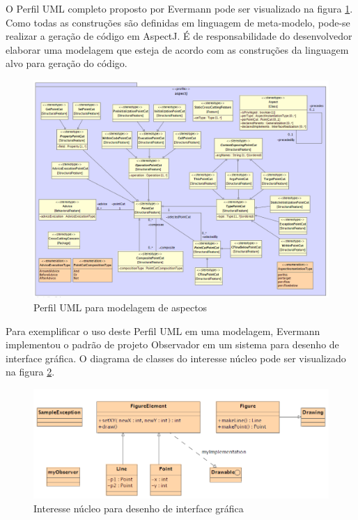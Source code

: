 O Perfil UML completo proposto por Evermann pode ser visualizado na figura \ref{fig:p21_aspectj_profile}. Como todas as construções são definidas em
linguagem de meta-modelo, pode-se realizar a geração de código em AspectJ. É de responsabilidade do desenvolvedor elaborar uma modelagem que esteja de acordo 
com as construções da linguagem alvo para geração do código. 

\begin{landscape}
\begin{figure}
	\centering
	\includegraphics[scale=0.6]{img/p21_aspectj_profile.png}
	\caption{Perfil UML para modelagem de aspectos \cite{Evermann:2007:MSP:1229375.1229379}}\label{fig:p21_aspectj_profile}
\end{figure}
\end{landscape}

Para exemplificar o uso deste Perfil UML em uma modelagem, Evermann implementou o padrão de projeto Observador \cite{Gamma:1995:DPE:186897} em um
sistema para desenho de interface gráfica. O diagrama de classes do interesse núcleo pode ser visualizado na figura \ref{fig:p21_base_model}. 

\begin{landscape}
\begin{figure}
	\centering
	\includegraphics[scale=0.8]{img/p21_base_model.png}
	\caption{Interesse núcleo para desenho de interface gráfica}\label{fig:p21_base_model}
\end{figure}
\end{landscape}

